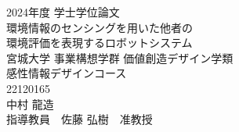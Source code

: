 \begin{titlepage}
  \begin{center}
    {\large 2024年度 学士学位論文}\\
    \vspace{19\zh}
    {\Huge 環境情報のセンシングを用いた他者の\\環境評価を表現するロボットシステム}\\ %
    \vspace{22\zh}
    \large{
      宮城大学 事業構想学群 価値創造デザイン学類\\
      感性情報デザインコース\\
      \vspace{1\zh}
      22120165\\ %
      中村 龍造\\ %
      \vspace{3\zh}
      指導教員　佐藤 弘樹　准教授
    }
  \end{center}
\end{titlepage}
